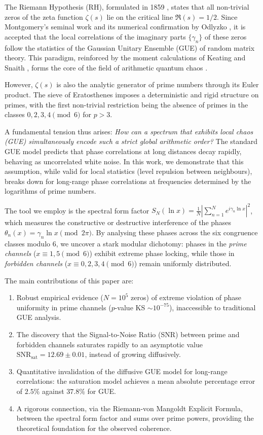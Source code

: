 \documentclass[12pt,a4paper]{article}
\theoremstyle{plain}
\theoremstyle{definition}
\theoremstyle{remark}
\begin{document}
The Riemann Hypothesis (RH), formulated in 1859 \cite{riemann1859}, states that all non-trivial zeros of the zeta function \(\zeta(s)\) lie on the critical line \(\Re(s)=1/2\). Since Montgomery's seminal work \cite{montgomery1973} and its numerical confirmation by Odlyzko \cite{odlyzko2001}, it is accepted that the local correlations of the imaginary parts \(\{\gamma_n\}\) of these zeros follow the statistics of the Gaussian Unitary Ensemble (GUE) of random matrix theory. This paradigm, reinforced by the moment calculations of Keating and Snaith \cite{keatingsnaith2000}, forms the core of the field of arithmetic quantum chaos \cite{katzsarnak1999, sarnak1999}.

However, \(\zeta(s)\) is also the analytic generator of prime numbers through its Euler product. The sieve of Eratosthenes imposes a deterministic and rigid structure on primes, with the first non-trivial restriction being the absence of primes in the classes \(0,2,3,4 \pmod{6}\) for \(p>3\).

A fundamental tension thus arises: \emph{How can a spectrum that exhibits local chaos (GUE) simultaneously encode such a strict global arithmetic order?} The standard GUE model predicts that phase correlations at long distances decay rapidly, behaving as uncorrelated white noise. In this work, we demonstrate that this assumption, while valid for local statistics (level repulsion between neighbours), breaks down for long-range phase correlations at frequencies determined by the logarithms of prime numbers.

The tool we employ is the spectral form factor \(S_N(\ln x) = \frac{1}{N}\left|\sum_{n=1}^N e^{i\gamma_n \ln x}\right|^2\), which measures the constructive or destructive interference of the phases \(\theta_n(x) = \gamma_n \ln x \pmod{2\pi}\). By analysing these phases across the six congruence classes modulo \(6\), we uncover a stark modular dichotomy: phases in the \emph{prime channels} (\(x \equiv 1,5 \pmod{6}\)) exhibit extreme phase locking, while those in \emph{forbidden channels} (\(x \equiv 0,2,3,4 \pmod{6}\)) remain uniformly distributed.

The main contributions of this paper are:
\begin{enumerate}[label=(\arabic*)]
    \item Robust empirical evidence (\(N=10^5\) zeros) of extreme violation of phase uniformity in prime channels (\(p\)-value KS \(\sim 10^{-75}\)), inaccessible to traditional GUE analysis.
    \item The discovery that the Signal-to-Noise Ratio (SNR) between prime and forbidden channels saturates rapidly to an asymptotic value \(\mathrm{SNR}_{\mathrm{sat}} = 12.69 \pm 0.01\), instead of growing diffusively.
    \item Quantitative invalidation of the diffusive GUE model for long-range correlations: the saturation model achieves a mean absolute percentage error of \(2.5\%\) against \(37.8\%\) for GUE.
    \item A rigorous connection, via the Riemann-von Mangoldt Explicit Formula, between the spectral form factor and sums over prime powers, providing the theoretical foundation for the observed coherence.
\end{enumerate}
\end{document}
